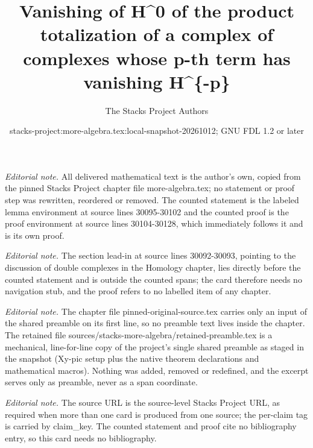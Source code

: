 \documentclass[10pt,a4paper]{amsart}
\title{Vanishing of H\textasciicircum{}0 of the product totalization of a complex of complexes whose p-th term has vanishing H\textasciicircum{}\{-p\}}
\author{The Stacks Project Authors}
\date{stacks-project:more-algebra.tex:local-snapshot-20261012; GNU FDL 1.2 or later}
\theoremstyle{plain}
\theoremstyle{definition}
\theoremstyle{remark}
\numberwithin{equation}{subsection}
\begin{document}
\maketitle
\setcounter{subsection}{1}
\noindent\textit{Editorial note.} All delivered mathematical text is the author's own, copied from the pinned Stacks Project chapter file more-algebra.tex; no statement or proof step was rewritten, reordered or removed. The counted statement is the labeled lemma environment at source lines 30095-30102 and the counted proof is the proof environment at source lines 30104-30128, which immediately follows it and is its own proof.\par\medskip
\noindent\textit{Editorial note.} The section lead-in at source lines 30092-30093, pointing to the discussion of double complexes in the Homology chapter, lies directly before the counted statement and is outside the counted spans; the card therefore needs no navigation stub, and the proof refers to no labelled item of any chapter.\par\medskip
\noindent\textit{Editorial note.} The chapter file pinned-original-source.tex carries only an input of the shared preamble on its first line, so no preamble text lives inside the chapter. The retained file sources/stacks-more-algebra/retained-preamble.tex is a mechanical, line-for-line copy of the project's single shared preamble as staged in the snapshot (Xy-pic setup plus the native theorem declarations and mathematical macros). Nothing was added, removed or redefined, and the excerpt serves only as preamble, never as a span coordinate.\par\medskip
\noindent\textit{Editorial note.} The source URL is the source-level Stacks Project URL, as required when more than one card is produced from one source; the per-claim tag is carried by claim\_key. The counted statement and proof cite no bibliography entry, so this card needs no bibliography.\par\medskip
\end{document}

